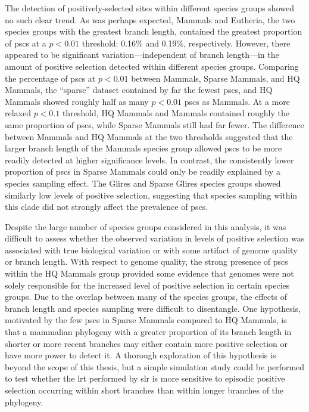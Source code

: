 The detection of positively-selected sites within different species
groups showed no such clear trend. As was perhaps expected, Mammals
and Eutheria, the two species groups with the greatest branch length,
contained the greatest proportion of \acp{psc} at a $p<0.01$
threshold: 0.16\% and 0.19\%, respectively. However, there appeared to
be significant variation---independent of branch length---in the
amount of positive selection detected within different species
groups. Comparing the percentage of \acp{psc} at $p<0.01$ between
Mammals, Sparse Mammals, and HQ Mammals, the ``sparse'' dataset
contained by far the fewest \acp{psc}, and HQ Mammals showed roughly
half as many $p<0.01$ \acp{psc} as Mammals. At a more relaxed $p<0.1$
threshold, HQ Mammals and Mammals contained roughly the same
proportion of \acp{psc}, while Sparse Mammals still had far fewer. The
difference between Mammals and HQ Mammals at the two thresholds
suggested that the larger branch length of the Mammals species group
allowed \acp{psc} to be more readily detected at higher significance
levels. In contrast, the consistently lower proportion of \acp{psc} in
Sparse Mammals could only be readily explained by a species sampling
effect. The Glires and Sparse Glires species groups showed similarly
low levels of positive selection, suggesting that species sampling
within this clade did not strongly affect the prevalence of \acp{psc}.

Despite the large number of species groups considered in this
analysis, it was difficult to assess whether the observed variation in
levels of positive selection was associated with true biological
variation or with some artifact of genome quality or branch
length. With respect to genome quality, the strong presence of
\acp{psc} within the HQ Mammals group provided some evidence that \lcv
genomes were not solely responsible for the increased level of
positive selection in certain species groups. Due to the overlap
between many of the species groups, the effects of branch length and
species sampling were difficult to disentangle. One hypothesis,
motivated by the few \acp{psc} in Sparse Mammals compared to HQ
Mammals, is that a mammalian phylogeny with a greater proportion of
its branch length in shorter or more recent branches may either
contain more positive selection or have more power to detect it. A
thorough exploration of this hypothesis is beyond the scope of this
thesis, but a simple simulation study could be performed to test
whether the \ac{lrt} performed by \ac{slr} is more sensitive to
episodic positive selection occurring within short branches than
within longer branches of the phylogeny.

